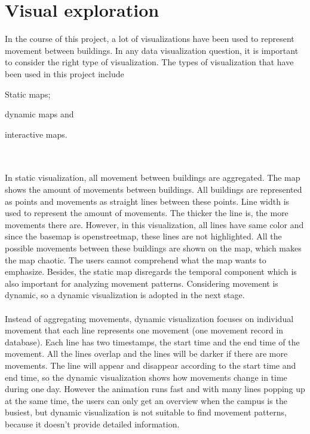 \section{Visual exploration}\label{kaas}
In the course of this project, a lot of visualizations have been used to represent movement between buildings. In any data visualization question, it is important to consider the right type of visualization. The types of visualization that have been used in this project include \begin {enumerate*} [label=\itshape\arabic*\upshape),font={\color{red!0!black}\bfseries}] \item Static maps; \item dynamic maps and \item interactive maps. \end {enumerate*}
\\\\
In static visualization, all movement between buildings are aggregated. The map shows the amount of movements between buildings. All buildings are represented as points and movements as straight lines between these points. Line width is used to represent the amount of movements. The thicker the line is, the more movements there are. However, in this visualization, all lines have same color and since the basemap is openstreetmap, these lines are not highlighted. All the possible movements between these buildings are shown on the map, which makes the map chaotic. The users cannot comprehend what the map wants to emphasize. Besides, the static map disregards the temporal component which is also important for analyzing movement patterns. Considering movement is dynamic, so a dynamic visualization is adopted in the next stage.
\\\\
Instead of aggregating movements, dynamic visualization focuses on individual movement that each line represents one movement (one movement record in database). Each line has two timestamps, the start time and the end time of the movement. All the lines overlap and the lines will be darker if there are more movements. The line will appear and disappear according to the start time and end time, so the dynamic visualization shows how movements change in time during one day. However the animation runs fast and with many lines popping up at the same time, the users can only get an overview when the campus is the busiest, but dynamic visualization is not suitable to find movement patterns, because it doesn't provide detailed information.
